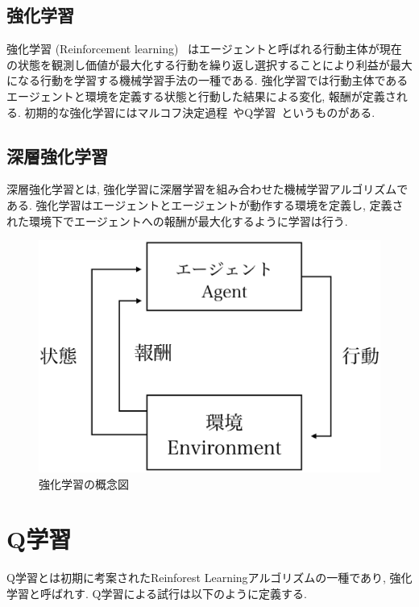 \subsection{強化学習}

強化学習 (Reinforcement learning) ~\cite{ReinforcementLearning}はエージェントと呼ばれる行動主体が現在の状態を観測し価値が最大化する行動を繰り返し選択することにより利益が最大になる行動を学習する機械学習手法の一種である.
強化学習では行動主体であるエージェントと環境を定義する状態と行動した結果による変化, 報酬が定義される.
初期的な強化学習にはマルコフ決定過程~\cite{ReinforcementLearning}やQ学習~\cite{QL}というものがある.

\subsection{深層強化学習}

深層強化学習とは, 強化学習に深層学習を組み合わせた機械学習アルゴリズムである.
強化学習はエージェントとエージェントが動作する環境を定義し, 定義された環境下でエージェントへの報酬が最大化するように学習は行う.

\begin{figure}[H]
    \centering
    \includegraphics[clip,width = 12.0cm]{assets/reinforcement_learning.eps}
    \caption{強化学習の概念図}  \label{sample}
\end{figure}

\section{Q学習}

Q学習とは初期に考案されたReinforest Learningアルゴリズムの一種であり, 強化学習と呼ばれす.
Q学習による試行は以下のように定義する.


